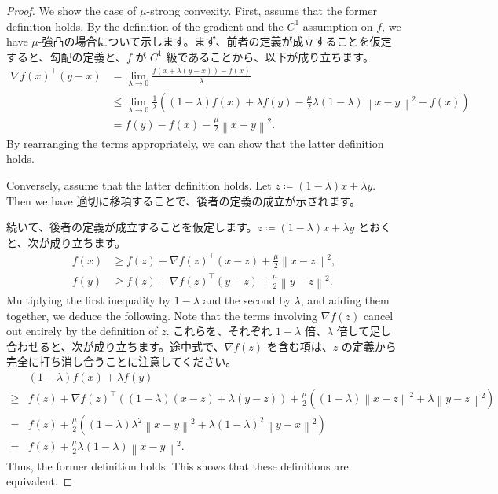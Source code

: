 \documentclass[0_main]{subfiles}
\begin{document}
\begin{proof}
    \ifEn
        We show the case of $\mu$-strong convexity.
        First, assume that the former definition holds. By the definition of the gradient and the $C^1$ assumption on $f$, we have
    \else
        $\mu$-強凸の場合について示します。まず、前者の定義が成立することを仮定すると、勾配の定義と、$f$ が $C^1$ 級であることから、以下が成り立ちます。
    \fi
    \begin{align*}
        \nabla f(x)^\top (y-x)
         & =\lim_{\lambda \to 0} \frac{f(x+ \lambda (y-x)) - f(x)}{\lambda}                                                                                                    \\
         & \le \lim_{\lambda \to 0} \frac{1}{\lambda} \left( (1-\lambda) f(x) + \lambda f(y) - \frac{\mu}{2} \lambda (1-\lambda) \left\lVert x-y \right\rVert^2 - f(x) \right) \\
         & = f(y) - f(x) - \frac{\mu}{2} \left\lVert x-y \right\rVert^2.
    \end{align*}
    \ifEn
        By rearranging the terms appropriately, we can show that the latter definition holds.

        Conversely, assume that the latter definition holds. Let $z \coloneqq (1-\lambda)x + \lambda y$. Then we have
    \else
        適切に移項することで、後者の定義の成立が示されます。

        続いて、後者の定義が成立することを仮定します。$z \coloneqq (1-\lambda)x + \lambda y$ とおくと、次が成り立ちます。
    \fi
    \begin{align*}
        f(x) & \geq f(z) + \nabla f(z)^\top (x-z) + \frac{\mu}{2} \left\lVert x-z \right\rVert^2, \\
        f(y) & \geq f(z) + \nabla f(z)^\top (y-z) + \frac{\mu}{2} \left\lVert y-z \right\rVert^2.
    \end{align*}
    \ifEn
        Multiplying the first inequality by $1-\lambda$ and the second by $\lambda$, and adding them together, we deduce the following.
        Note that the terms involving $\nabla f(z)$ cancel out entirely by the definition of $z$.
    \else
        これらを、それぞれ $1-\lambda$ 倍、$\lambda$ 倍して足し合わせると、次が成り立ちます。途中式で、$\nabla f(z)$ を含む項は、$z$ の定義から完全に打ち消し合うことに注意してください。
    \fi
    \begin{align*}
               & (1-\lambda) f(x) + \lambda f(y)
        \\
        \geq{} & f(z) + \nabla f(z)^\top \left( (1-\lambda)(x-z) + \lambda (y-z) \right)
        + \frac{\mu}{2} \left( (1-\lambda) \left\lVert x-z \right\rVert^2 + \lambda \left\lVert y-z \right\rVert^2 \right)                                       \\
        ={}    & f(z) + \frac{\mu}{2} \left( (1-\lambda) \lambda^2 \left\lVert x-y \right\rVert^2 + \lambda (1-\lambda)^2 \left\lVert y-x \right\rVert^2 \right) \\
        ={}    & f(z) + \frac{\mu}{2} \lambda (1-\lambda) \left\lVert x-y \right\rVert^2.
    \end{align*}
    \ifEn
        Thus, the former definition holds. This shows that these definitions are equivalent.


\end{proof}
\end{document}
